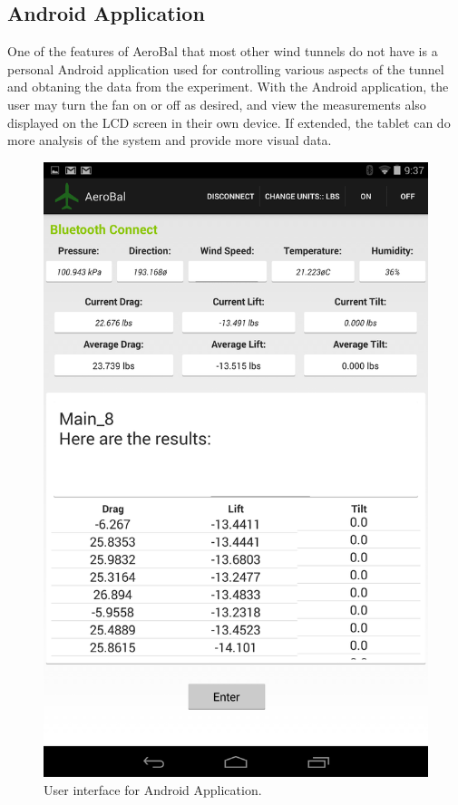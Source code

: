 		\subsection{Android Application}
		
		One of the features of AeroBal that most other wind tunnels do not have is a personal Android application used for controlling various aspects of the tunnel and obtaning the data from the experiment. With the Android application, the user may turn the fan on or off as desired, and view the measurements also displayed on the LCD screen in their own device. If extended, the tablet can do more analysis of the system and provide more visual data.
		
		\begin{figure}[H]
			\centering
				\includegraphics[scale=0.2]{img/androidApp}
			\caption{User interface for Android Application.}
		\end{figure}
		
